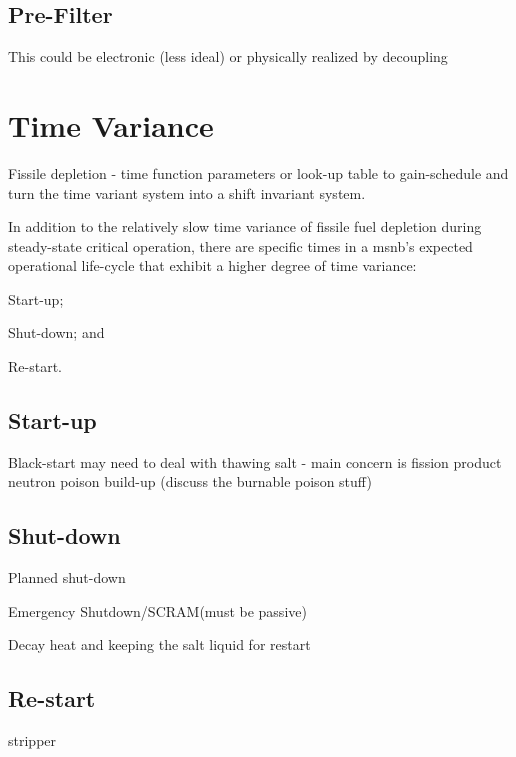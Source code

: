 \subsection{Pre-Filter}
This could be electronic (less ideal) or physically realized by decoupling 


\section{Time Variance}
Fissile depletion - time function parameters or look-up table to gain-schedule and turn the time variant system into a shift invariant system.

In addition to the relatively slow time variance of fissile fuel depletion during steady-state critical operation, there are specific times in a \acs{msnb}'s expected operational life-cycle that exhibit a higher degree of time variance: 
\begin{enumerate*}[label=\arabic*)]
\item Start-up; \item Shut-down; and \item Re-start.
\end{enumerate*}

\subsection{Start-up}
Black-start may need to deal with thawing salt - main concern is fission product neutron poison build-up (discuss the burnable poison stuff)

\subsection{Shut-down}
Planned shut-down

Emergency Shutdown/SCRAM(must be passive)

Decay heat and keeping the salt liquid for restart

\subsection{Re-start}
\Xe stripper

